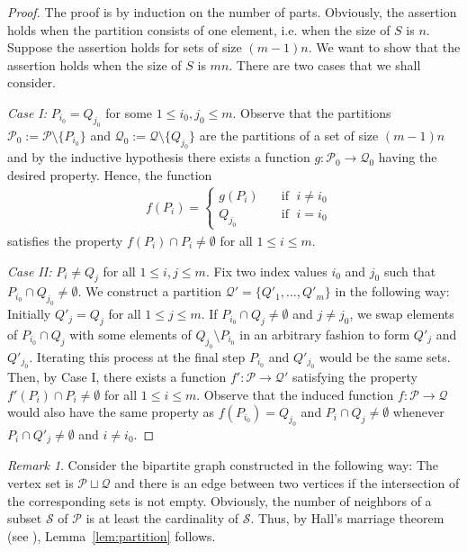 \documentclass[a4paper,12pt]{article}
\theoremstyle{definition}
\theoremstyle{remark}
\newtheorem*{rem}{Remark}
\begin{document}
\begin{proof}
  The proof is by induction on the number of parts. Obviously, the assertion holds when the partition consists of one element, i.e. when the size of $S$ is $n$. Suppose the assertion holds for sets of size $(m-1)n$. We want to show that the assertion holds when the size of $S$ is $mn$. There are two cases that we shall consider.

  \medskip
  \noindent
  \emph{Case I:} $P_{i_0}=Q_{j_0}$ for some $1\leq i_0,j_0\leq m$. Observe that the partitions $\mathcal{P}_0:= \mathcal{P}\setminus \{P_{i_0}\}$ and $\mathcal{Q}_0:= \mathcal{Q}\setminus \{Q_{j_0}\}$ are the partitions of a set of size $(m-1)n$ and by the inductive hypothesis there exists a function $g\colon \mathcal{P}_0\to \mathcal{Q}_0$ having the desired property. Hence, the function
  \begin{align*}
    &f(P_i) =
      \begin{cases}
        g(P_i) & \quad \text{if }\; i\neq i_0 \\
        Q_{j_0} & \quad \text{if }\; i= i_0
      \end{cases}
  \end{align*}
  satisfies the property $f(P_i)\cap P_i \neq \emptyset$ for all $1\leq i\leq m$.

  \medskip
  \noindent
  \emph{Case II:} $P_i\neq Q_j$ for all $1\leq i,j\leq m$. Fix two index values $i_0$ and $j_0$ such that $P_{i_0}\cap Q_{j_0}\neq \emptyset$. We construct a partition $\mathcal{Q}'=\{Q'_1,\dots,Q'_m\}$ in the following way: Initially $Q'_j=Q_j$ for all $1\leq j\leq m$. If $P_{i_0}\cap Q_j \neq \emptyset$ and $j\neq j_0$, we swap elements of $P_{i_0}\cap Q_j$ with some elements of $Q_{j_0}\setminus P_{i_0}$ in an arbitrary fashion to form $Q'_j$ and $Q'_{j_0}$. Iterating this process at the final step $P_{i_0}$ and $Q'_{j_0}$ would be the same sets. Then, by Case I, there exists a function $f'\colon \mathcal{P}\to \mathcal{Q}'$ satisfying the property $f'(P_i)\cap P_i \neq \emptyset$ for all $1\leq i\leq m$. Observe that the induced function $f\colon \mathcal{P}\to \mathcal{Q}$ would also have the same property as $f(P_{i_0})=Q_{j_0}$ and $P_i\cap Q_j\neq \emptyset$ whenever $P_i\cap Q'_j\neq \emptyset$ and $i\neq i_0$.
\end{proof}

\begin{rem}
  Consider the bipartite graph constructed in the following way: The vertex set is $\mathcal{P}\sqcup \mathcal{Q}$ and there is an edge between two vertices if the intersection of the corresponding sets is not empty. Obviously, the number of neighbors of a subset $\mathcal{S}$ of $\mathcal{P}$ is at least the cardinality of $\mathcal{S}$. Thus, by Hall's marriage theorem (see \cite[Theorem 2.1.2]{Die05}), Lemma~\ref{lem:partition} follows.
\end{rem}
\end{document}
